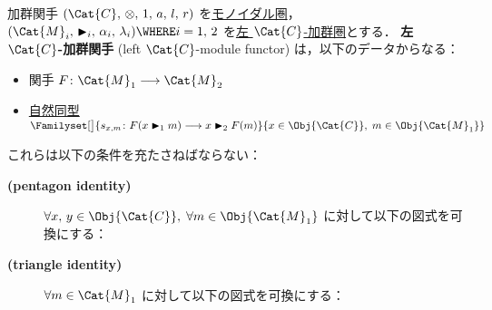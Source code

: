 \documentclass[TQFT_main]{subfiles}
\begin{document}
\begin{mydef}[label=def:module-functor,breakable]{加群関手}
    $(\Cat{C},\, \otimes,\, 1,\, a,\, l,\, r)$ を\hyperref[redef:monoidal-category]{モノイダル圏}，$(\Cat{M}_i,\, \btr_i,\, \alpha_i,\, \lambda_i) \WHERE i =1,\, 2$ を\hyperref[def:modulecat]{左 $\Cat{C}$-加群圏}とする．
    \textbf{左 $\Cat{C}$-加群関手} (left $\Cat{C}$-module functor) は，以下のデータからなる：
    \begin{itemize}
        \item 関手 $F \colon \Cat{M}_1 \lto \Cat{M}_2$
        \item \hyperref[def:nat]{自然同型} $\Familyset[\big]{s_{x,m} \colon F(x \btr_1 m) \lto x \btr_2 F(m)}{x \in \Obj{\Cat{C}},\; m \in \Obj{\Cat{M}_1}}$
    \end{itemize}
    これらは以下の条件を充たさねばならない：
    \begin{description}
        \item[\textbf{(pentagon identity)}] $\forall x,\, y \in \Obj{\Cat{C}},\; \forall m \in \Obj{\Cat{M}_1}$ に対して以下の図式を可換にする：
        \begin{flushleft}
        \end{flushleft}
        
        \item[\textbf{(triangle identity)}] $\forall m \in \Cat{M}_1$ に対して以下の図式を可換にする：
        \begin{center}
        \end{center}
    \end{description}
    

\end{mydef}
\end{document}
